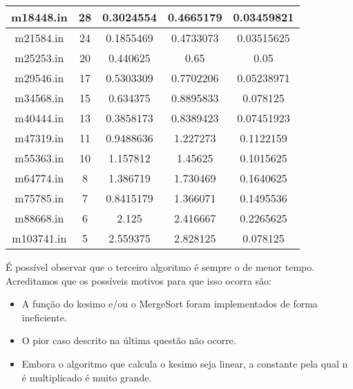 \documentclass[10pt,a4paper]{article}
\begin{document}
\begin{center}
\begin{tabular}{|c|c|c|c|c|}
			\hline 
			m18448.in & 28  &    0.3024554       &    0.4665179       &    0.03459821\\
			\hline 
			m21584.in &  24  &    0.1855469       &    0.4733073       &    0.03515625\\
			\hline 
			m25253.in &  20 &    0.440625        &    0.65            &    0.05\\
			\hline 
			m29546.in &  17 &    0.5303309       &    0.7702206       & 0.05238971\\
			\hline 
			m34568.in & 15 &    0.634375        &    0.8895833       & 0.078125\\
			\hline 
			m40444.in &  13 &    0.3858173       &    0.8389423       &    0.07451923\\
			\hline 
			m47319.in & 11  &    0.9488636       &    1.227273        &    0.1122159\\
			\hline 
			m55363.in & 10  &    1.157812        &    1.45625         &    0.1015625\\
			\hline 
			m64774.in & 8  &    1.386719        &    1.730469        &    0.1640625\\
			\hline 
			m75785.in & 7  &    0.8415179       &    1.366071        &    0.1495536\\
			\hline 
			m88668.in & 6  &    2.125           &    2.416667        &    0.2265625\\
			\hline 
			m103741.in & 5  &    2.559375        &    2.828125        &    0.078125\\
			\hline 

		
		\end{tabular}
	\end{center}
	
	É possível observar que o terceiro algoritmo é sempre o de menor tempo. Acreditamos que os possíveis motivos para que isso ocorra são:
	
	\begin{itemize}
		\item A função do kesimo e/ou o MergeSort foram implementados de forma ineficiente.
		\item O pior caso descrito na última questão não ocorre.
		\item Embora o algoritmo que calcula o kesimo seja linear, a constante pela qual n é multiplicado é muito grande.
	\end{itemize}
\end{document}
